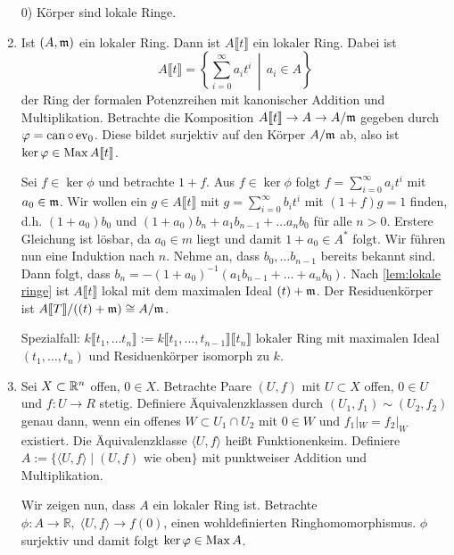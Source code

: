 \documentclass[12pt,a4paper]{scrartcl}
\theoremstyle{cplain}
\theoremstyle{cdef}
\begin{document}
\begin{bsp}
	\begin{enumerate}
        \leavevmode
		\item[0)] Körper sind lokale Ringe.
        \item Ist $(A,\mathfrak{m})$ ein lokaler Ring. Dann ist $A\llbracket t \rrbracket$ ein lokaler Ring. Dabei ist \[ A\llbracket t \rrbracket=\left\{\sum_{i=0}^\infty a_it^i \,\middle|\, a_i \in A\right\} \] der Ring der formalen Potenzreihen mit kanonischer Addition und Multiplikation. Betrachte die Komposition $A\llbracket t \rrbracket \to A \to A/\mathfrak{m}$ gegeben durch $\varphi=\operatorname{can} \circ \operatorname{ev}_0$. Diese bildet surjektiv auf den Körper $A/\mathfrak{m}$ ab, also ist $\operatorname{ker} \varphi \in \operatorname{Max} A\llbracket t \rrbracket$.
        
        Sei $f \in \ker \phi$ und betrachte $1+ f$. Aus $f \in \ker \phi$ folgt $f=\sum_{i=0}^\infty a_it^i$ mit $a_0 \in \mathfrak{m}$. Wir wollen ein $g \in A\llbracket t\rrbracket$ mit $g=\sum_{i=0}^\infty b_it^i$ mit $(1+f)g=1$ finden, d.h. $(1+a_0)b_0$ und $(1+a_0)b_n+a_1b_{n-1}+\dots a_nb_0$ für alle $n > 0$. Erstere Gleichung ist lösbar, da $a_0 \in m$ liegt und damit $1+a_0 \in A^*$ folgt. Wir führen nun eine Induktion nach $n$. Nehme an, dass $b_0, \dots b_{n-1}$ bereits bekannt sind. Dann folgt, dass $b_n=-(1+a_0)^{-1}(a_1b_{n-1}+\dots+a_nb_0)$. Nach \cref{lem:lokale ringe} ist $A\llbracket t \rrbracket$ lokal mit dem maximalen Ideal $(t)+\mathfrak{m}$. Der Residuenkörper ist $A\llbracket T\rrbracket /((t)+\mathfrak{m}) \cong A/\mathfrak{m}$.

        Spezialfall: $k\llbracket t_1,\dots t_n\rrbracket := k\llbracket t_1,\dots,t_{n-1}\rrbracket\llbracket t_n\rrbracket$ lokaler Ring mit maximalen Ideal $(t_1,\dots,t_n)$ und Residuenkörper isomorph zu $k$.
        
		\item Sei $X \subset \mathbb R^n$ offen, $0 \in X$. Betrachte Paare $(U,f)$ mit $U \subset X$ offen, $0 \in U$ und $f:U \to R$ stetig. Definiere Äquivalenzklassen durch $(U_1,f_1) \sim (U_2,f_2)$ genau dann, wenn ein offenes $W \subset U_1 \cap U_2$ mit $0 \in W$ und $f_1|_W=f_2|_W$ existiert. Die Äquivalenzklasse $\langle U,f \rangle$ heißt Funktionenkeim. Definiere $A := \{\langle U,f \rangle \mid (U,f) \text{ wie oben}\}$ mit  punktweiser Addition und Multiplikation.

		Wir zeigen nun, dass $A$ ein lokaler Ring ist. Betrachte $\phi: A \to \mathbb{R}, \; \langle U,f \rangle \to f(0)$, einen wohldefinierten Ringhomomorphismus. $\phi$ surjektiv und damit folgt $\operatorname{ker} \varphi \in \operatorname{Max} A$.


\end{enumerate}
\end{bsp}
\end{document}
